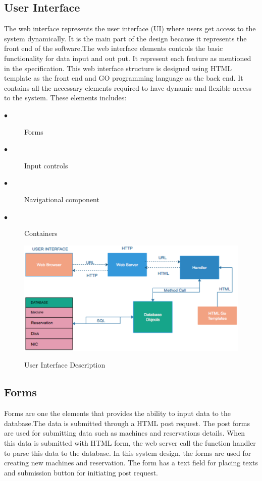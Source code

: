 \subsection{User Interface}
The web interface represents the user interface (UI) where users get access to the system dynamically. It is the main part of the design because it represents the front end of the software.The web interface elements controls the basic functionality for data input and out put. It represent each feature as mentioned in the specification. This web interface structure is designed using  HTML template as the front end and GO programming language as the back end. It contains all the necessary elements required to have dynamic and flexible access to the system. These elements includes:
\begin{description}
  \item[$\bullet$] Forms
  \item[$\bullet$] Input controls
  \item[$\bullet$] Navigational component
  \item[$\bullet$] Containers
\end{description}
\begin{figure}[ht]
\includegraphics[width = \linewidth]{Design.eps}
\label{fig:Web Inteerface} 
\caption{User Interface Description}
\end{figure}


\subsection*{Forms}
 Forms are one the elements that provides the ability to input data to the database.The data is submitted through a HTML post request. The post forms are used for submitting data such as machines and reservations details. When this data is submitted with HTML form, the web server call the function handler to parse this data to the database. In this system design, the forms are used for creating new machines and reservation. The form has a text field for placing texts and submission button for initiating post request. 

